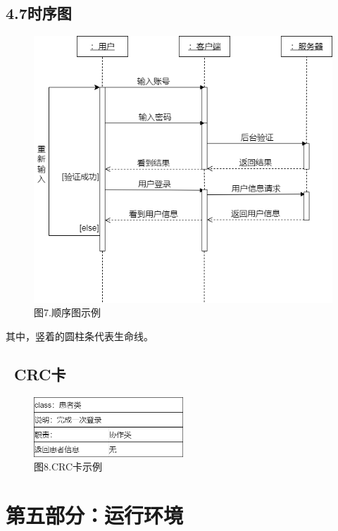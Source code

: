 \documentclass[24pt,a4paper]{article}%
\begin{document}
\subsection*{\songti 4.7时序图}
\begin{figure}[H]
    \centering
    \includegraphics[width=1\textwidth]{images/顺序图.png}
    \caption*{图7.顺序图示例}
\end{figure}
其中，竖着的圆柱条代表生命线。
\subsection*{\ CRC卡}
\begin{figure}[H]
    \centering
    \includegraphics[width=0.5\textwidth]{images/CRC卡.png}
    \caption*{图8.CRC卡示例}
\end{figure}
\newpage

\section*{\songti 第五部分：运行环境}
\end{document}
